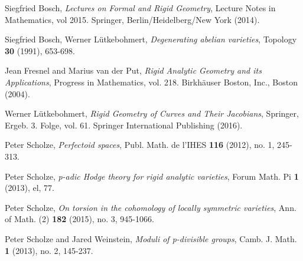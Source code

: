 \documentclass[10pt,oneside]{amsart}
\theoremstyle{definition}
\begin{document}
 
\begin{thebibliography}{99}
	
	Siegfried Bosch,
	\textit{Lectures on Formal and Rigid Geometry}, Lecture Notes in Mathematics, vol 2015. Springer, Berlin/Heidelberg/New York (2014).
	
	Siegfried Bosch, Werner L\"utkebohmert,
	\textit{Degenerating abelian varieties}, Topology {\bf 30} (1991), 653-698.
	
	Jean Fresnel and Marius van der Put,
	\textit{Rigid Analytic Geometry and its Applications}, Progress in Mathematics, vol. 218. Birkh\"auser Boston, Inc., Boston (2004).
	
	Werner L\"utkebohmert,
	\textit{Rigid Geometry of Curves and Their Jacobians}, Springer, Ergeb. 3. Folge, vol. 61. Springer International Publishing (2016). 
	
	Peter Scholze,
	\textit{Perfectoid spaces}, Publ. Math. de l'IHES {\bf 116} (2012), no. 1, 245-313.
	
	Peter Scholze,
	\textit{p-adic Hodge theory for rigid analytic varieties}, Forum Math. Pi {\bf 1} (2013), el, 77.
	
	Peter Scholze,
	\textit{On torsion in the cohomology of locally symmetric varieties}, Ann. of Math. (2) {\bf 182} (2015), no. 3, 945-1066.
	
	Peter Scholze and Jared Weinstein,
	\textit{Moduli of p-divisible groups}, Camb. J. Math. {\bf 1} (2013), no. 2, 145-237.
	
\end{thebibliography}

	
	
\end{document}
